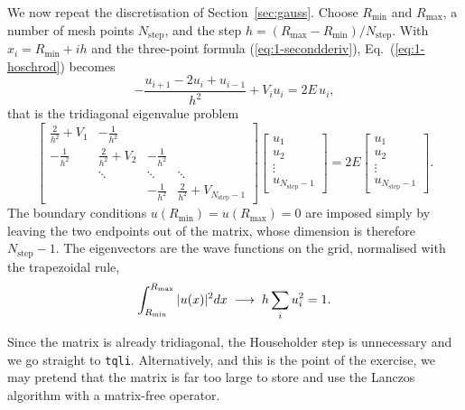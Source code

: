 We now repeat the discretisation of Section~\ref{sec:gauss}.  Choose
$R_{\mathrm{min}}$ and $R_{\mathrm{max}}$, a number of mesh points
$N_{\mathrm{step}}$, and the step
$h=(R_{\mathrm{max}}-R_{\mathrm{min}})/N_{\mathrm{step}}$.  With
$x_i=R_{\mathrm{min}}+ih$ and the three-point formula
(\ref{eq:1-secondderiv}), Eq.~(\ref{eq:1-hoschrod}) becomes
\begin{equation}
  -\frac{u_{i+1}-2u_i+u_{i-1}}{h^2} + V_i u_i = 2E\,u_i ,
  \label{eq:1-hodisc}
\end{equation}
that is the tridiagonal eigenvalue problem
\begin{equation}
  \begin{bmatrix}
    \frac{2}{h^2}+V_1 & -\frac{1}{h^2} &  &  \\
    -\frac{1}{h^2} & \frac{2}{h^2}+V_2 & -\frac{1}{h^2} & \\
     & \ddots & \ddots & \ddots\\
     &  & -\frac{1}{h^2} & \frac{2}{h^2}+V_{N_{\mathrm{step}}-1}
  \end{bmatrix}
  \begin{bmatrix}u_1\\u_2\\\vdots\\u_{N_{\mathrm{step}}-1}\end{bmatrix}
  = 2E
  \begin{bmatrix}u_1\\u_2\\\vdots\\u_{N_{\mathrm{step}}-1}\end{bmatrix}.
  \label{eq:1-homatrix}
\end{equation}
The boundary conditions $u(R_{\mathrm{min}})=u(R_{\mathrm{max}})=0$ are
imposed simply by leaving the two endpoints out of the matrix, whose dimension
is therefore $N_{\mathrm{step}}-1$.  The eigenvectors are the wave functions
on the grid, normalised with the trapezoidal rule,
\begin{equation}
  \int_{R_{\mathrm{min}}}^{R_{\mathrm{max}}}|u(x)|^2dx
   \;\longrightarrow\; h\sum_{i}u_i^2 = 1 .
  \label{eq:1-trapnorm}
\end{equation}

Since the matrix is already tridiagonal, the Householder step is unnecessary
and we go straight to \texttt{tqli}.  Alternatively, and this is the point of
the exercise, we may pretend that the matrix is far too large to store and use
the Lanczos algorithm with a matrix-free operator.

